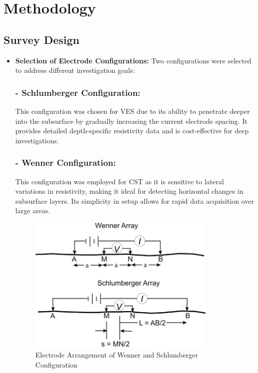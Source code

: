 \documentclass[12pt,a4paper]{report}
\begin{document}
\section{Methodology}
\subsection{Survey Design}
\begin{itemize}
    \item \textbf{Selection of Electrode Configurations:}  
    Two configurations were selected to address different investigation goals:
    \subsubsection{- Schlumberger Configuration:} This configuration was chosen for VES due to its ability to penetrate deeper into the subsurface by gradually increasing the current electrode spacing. It provides detailed depth-specific resistivity data and is cost-effective for deep investigations.
    \subsubsection{- Wenner Configuration:} This configuration was employed for CST as it is sensitive to lateral variations in resistivity, making it ideal for detecting horizontal changes in subsurface layers. Its simplicity in setup allows for rapid data acquisition over large areas.
    \\[1cm]
    \begin{figure}[h]
        \centering
        \includegraphics[width=0.85\textwidth]{wenner_schlum.jpg}
        \caption{Electrode Arrangement of Wenner and Schlumberger Configuration}
    \end{figure}


\end{itemize}
\end{document}
